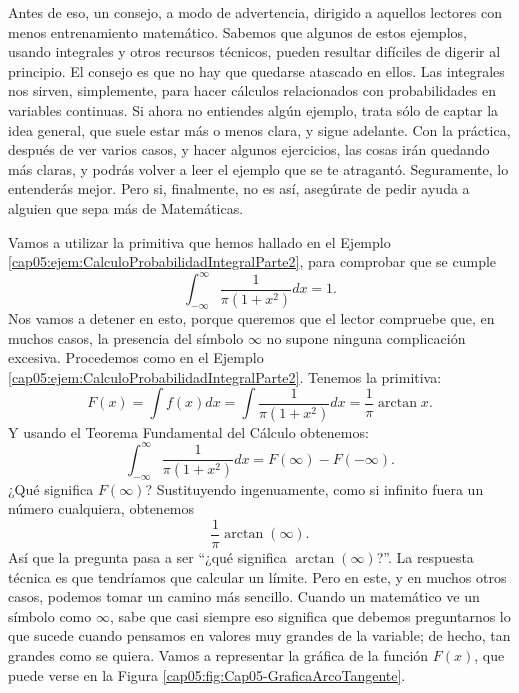Antes de eso, un consejo, a modo de advertencia, dirigido a aquellos lectores con menos entrenamiento matemático. Sabemos que algunos de estos ejemplos, usando integrales y otros recursos técnicos, pueden resultar difíciles de digerir al principio. El consejo es que no hay que quedarse atascado en ellos. Las integrales nos sirven, simplemente, para hacer cálculos relacionados con probabilidades en variables continuas. Si ahora no entiendes algún ejemplo, trata sólo de captar la idea general, que suele estar más o menos clara, y sigue adelante. Con la práctica, después de ver varios casos, y hacer algunos ejercicios, las cosas irán quedando más claras, y podrás volver a leer el ejemplo que se te atragantó. Seguramente, lo entenderás mejor. Pero si, finalmente, no es así, asegúrate de pedir ayuda a alguien que sepa más de Matemáticas.
\begin{ejemplo}
\label{cap05:ejem:DistribucionCauchyIntegralTotal1}
    Vamos a utilizar la primitiva que hemos hallado en el Ejemplo \ref{cap05:ejem:CalculoProbabilidadIntegralParte2}, para comprobar que se cumple
    \[\int_{-\infty}^{\infty}\dfrac{1}{\pi(1+x^2)}dx=1.\]
    Nos vamos a detener en esto, porque queremos que el lector compruebe que, en muchos casos, la presencia del símbolo $\infty$ no supone ninguna complicación excesiva. Procedemos como en el Ejemplo \ref{cap05:ejem:CalculoProbabilidadIntegralParte2}. Tenemos la primitiva:
    \[F(x)=\int f(x)dx=\int \frac{1}{\pi(1+x^2)} dx = \dfrac{1}{\pi}\arctan x.\]
    Y usando el Teorema Fundamental del Cálculo obtenemos:
    \[\int_{-\infty}^{\infty}\dfrac{1}{\pi(1+x^2)}dx=F(\infty)-F(-\infty).\]
    ¿Qué significa $F(\infty)$? Sustituyendo ingenuamente, como si infinito fuera un número cualquiera, obtenemos
    \[\dfrac{1}{\pi}\arctan(\infty).\]
    Así que la pregunta pasa a ser ``¿qué significa $\arctan(\infty)$?''. La respuesta técnica es que tendríamos que calcular un límite. Pero en este, y en muchos otros casos, podemos tomar un camino más sencillo. Cuando un matemático ve un símbolo como $\infty$, sabe que casi siempre eso significa que debemos preguntarnos lo que sucede cuando pensamos en valores muy grandes de la variable; de hecho, tan grandes como se quiera. Vamos a representar la gráfica de la función $F(x)$, que puede verse en la Figura \ref{cap05:fig:Cap05-GraficaArcoTangente}.


\end{ejemplo}

